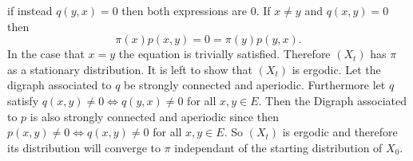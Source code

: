 \documentclass[a4paper]{article}
\begin{document}
if instead $q(y,x)=0$ then both expressions are $0$.
If $x\neq y$ and $q(x,y)=0 $ then 
\begin{equation*}
    \pi(x) p(x,y) = 0 = \pi (y) p(y,x).
\end{equation*}
In the case that $x=y$ the equation is trivially satisfied.
Therefore $(X_t)$ has $\pi$ as a stationary distribution.
It is left to show that $(X_t)$ is ergodic. Let the digraph associated to $q$ be strongly connected and aperiodic.
Furthermore let $q$ satisfy $q(x,y) \neq 0 \Leftrightarrow q(y,x) \neq 0$ for all $x,y \in E$.
Then the Digraph associated to $p$ is also strongly connected and aperiodic since then $p(x,y) \neq 0 \Leftrightarrow q(x,y) \neq 0$ for all $x,y \in E$.
So $(X_t)$ is ergodic and therefore its distribution will converge to $\pi$ independant of the starting distribution of $X_0$.
\end{document}
